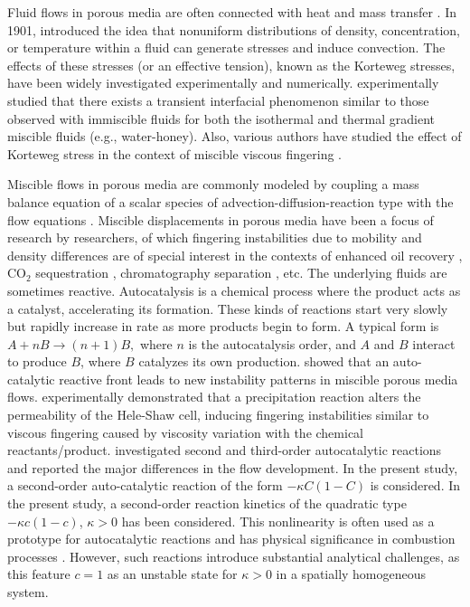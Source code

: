 \documentclass[final,3p,times]{elsarticle}
\theoremstyle{plain}
\theoremstyle{remark}
\theoremstyle{plain}
\theoremstyle{remark}
\begin{document}
Fluid flows in porous media are often connected with heat and mass transfer \cite{carbonell1984heat, delgado2011heat, homsy1987viscous, pramanik2013linear, dehghan2024fully, caucao2020fully, caucao2022posteriori}. In 1901, \citet{korteweg1901form} introduced the idea that nonuniform distributions of density, concentration, or temperature within a fluid can generate stresses and induce convection. The effects of these stresses (or an effective tension), known as the Korteweg stresses, have been widely investigated experimentally and numerically. \citet{pojman2007miscible} experimentally studied that there exists a transient interfacial phenomenon similar to those observed with immiscible fluids for both the isothermal and thermal gradient miscible fluids (e.g., water-honey). Also, various authors have studied the effect of Korteweg stress in the context of miscible viscous fingering \citep{swernath2010effect, chen2001miscible, chen2002miscible}.

Miscible flows in porous media are commonly modeled by coupling a mass balance equation of a scalar species of advection-diffusion-reaction type with the flow equations \citep{homsy1987viscous, pramanik2013linear, de2016chemo, rana2019influence}. Miscible displacements in porous media have been a focus of research by researchers, of which fingering instabilities due to mobility and density differences are of special interest in the contexts of enhanced oil recovery \citep{homsy1987viscous}, CO$_2$ sequestration \citep{huppert2014fluid}, chromatography separation \citep{rana2019influence}, etc. The underlying fluids are sometimes reactive. Autocatalysis is a chemical process where the product acts as a catalyst, accelerating its formation. These kinds of reactions start very slowly but rapidly increase in rate as more products begin to form. A typical form is 
\(
A + nB \rightarrow (n + 1)B,
\)
where \(n\) is the autocatalysis order, and \(A\) and \(B\) interact to produce \(B\), where \( B \) catalyzes its own production. \citet{de2001fingering} showed that an auto-catalytic reactive front leads to new instability patterns in miscible porous media flows. \citet{nagatsu2014hydrodynamic} experimentally demonstrated that a precipitation reaction alters the permeability of the Hele-Shaw cell, inducing fingering instabilities similar to viscous fingering caused by viscosity variation with the chemical reactants/product. \citet{Ghesmat2009} investigated second and third-order autocatalytic reactions and reported the major differences in the flow development. In the present study, a second-order auto-catalytic reaction of the form $-\kappa C(1-C)$ is considered.  
In the present study, a second-order reaction kinetics of the quadratic type $- \kappa c(1-c)$, $\kappa > 0$ has been considered. This nonlinearity is often used as a prototype for autocatalytic reactions \citep{fisher1937wave} and has physical significance in combustion processes \citep{williams2018combustion}. However, such reactions introduce substantial analytical challenges, as this feature $c = 1$ as an unstable state for $\kappa > 0$ in a spatially homogeneous system.
\end{document}
